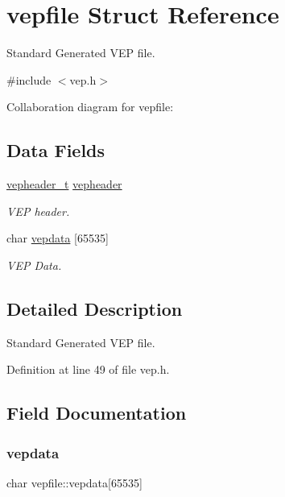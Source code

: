\hypertarget{a00119}{}\section{vepfile Struct Reference}
\label{a00119}


Standard Generated V\+EP file.  




{\ttfamily \#include $<$vep.\+h$>$}



Collaboration diagram for vepfile\+:
\subsection*{Data Fields}
\begin{DoxyCompactItemize}
\item 
\hyperlink{a00089_a78392c340e1fe1be344df81d1438b74f_a78392c340e1fe1be344df81d1438b74f}{vepheader\+\_\+t} \hyperlink{a00119_a0fa3b39f1e4974d4ed258db1d4b22402_a0fa3b39f1e4974d4ed258db1d4b22402}{vepheader}
\begin{DoxyCompactList}\small\item\em V\+EP header. \end{DoxyCompactList}\item 
char \hyperlink{a00119_a6a40903035403710bf43295c34e883e7_a6a40903035403710bf43295c34e883e7}{vepdata} \mbox{[}65535\mbox{]}
\begin{DoxyCompactList}\small\item\em V\+EP Data. \end{DoxyCompactList}\end{DoxyCompactItemize}


\subsection{Detailed Description}
Standard Generated V\+EP file. 

Definition at line 49 of file vep.\+h.



\subsection{Field Documentation}
\mbox{\label{a00119_a6a40903035403710bf43295c34e883e7_a6a40903035403710bf43295c34e883e7}} 
\subsubsection{\texorpdfstring{vepdata}{vepdata}}
{\footnotesize\ttfamily char vepfile\+::vepdata\mbox{[}65535\mbox{]}}



